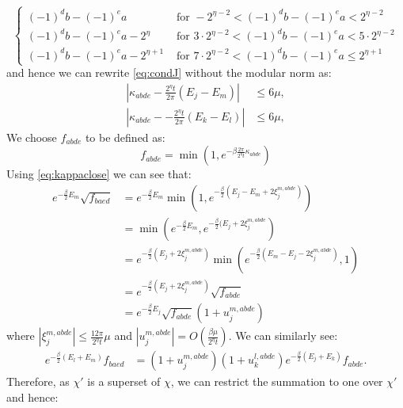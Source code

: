 \documentclass[aps,floatfix,10pt,amssymb,amsfont,amsmath,superscriptaddress,float,nofootinbib,longbibliography,nobalancelastpage,twocolumn]{revtex4-2}
\begin{document}
\begin{widetext}
\begin{equation}
\begin{cases}
     (-1)^db-(-1)^ea&\text{ for }-2^{\eta-2}<(-1)^db-(-1)^ea < 2^{\eta-2}\\
     (-1)^db-(-1)^ea-2^{\eta}&\text{ for }3\cdot 2^{\eta-2}< (-1)^db-(-1)^ea < 5\cdot2^{\eta-2}\\
     (-1)^db-(-1)^ea-2^{\eta+1}&\text{ for }7\cdot 2^{\eta-2}< (-1)^db-(-1)^ea \leq 2^{\eta+1}
    \end{cases}
\end{equation}
and hence we can rewrite \eqref{eq:condJ} without the modular norm as:
\begin{equation}
    \begin{aligned}
    \left|\kappa_{abde}-\frac{2^{\eta}t}{2\pi}(E_j-E_m)\right|&\leq 6\mu,\\
    \left|\kappa_{abde}--\frac{2^{\eta}t}{2\pi}(E_k-E_l)\right|&\leq 6\mu,
\end{aligned}
\label{eq:kappaclose}
\end{equation}
We choose $f_{abde}$ to be defined as:
\begin{equation}
    f_{abde} = \min(1,e^{-\beta\frac{2\pi}{2^{\eta}t}\kappa_{abde}})
\end{equation}
Using \eqref{eq:kappaclose} we can see that:
\begin{equation}
    \begin{aligned}
    e^{-\frac{\beta}{2}E_m}\sqrt{f_{baed}} &= e^{-\frac{\beta}{2}E_m}\min(1,e^{-\frac{\beta}{2}(E_j-E_m + 2\xi^{m,abde}_j)})\\
    &= \min(e^{-\frac{\beta}{2}E_m}, e^{-\frac{\beta}{2}(E_j + 2\xi^{m,abde}_j})\\
    &= e^{-\frac{\beta}{2}(E_j+ 2\xi^{m,abde}_j)} \min(e^{-\frac{\beta}{2}(E_m-E_j-2\xi^{m,abde}_j)},1)\\
    &= e^{-\frac{\beta}{2}(E_j+ 2\xi^{m,abde}_j)}\sqrt{f_{abde}}\\
    &= e^{-\frac{\beta}{2}E_j}\sqrt{f_{abde}}(1+u^{m,abde}_j)
\end{aligned}
\end{equation}
where $|\xi^{m,abde}_j| \leq \frac{12\pi}{2^{\eta}t}\mu$
and $|u^{m,abde}_j| = O(\frac{\beta \mu}{2^{\eta}t})$. We can similarly see:
\begin{equation}
\begin{aligned}
e^{-\frac{\beta}{2}(E_l+E_m)}f_{baed}
&=(1+u_j^{m,abde})(1+u_k^{l,abde})e^{-\frac{\beta}{2}(E_j+E_k)}f_{abde}.
\end{aligned}
\label{eq:fabtofba}
\end{equation}
Therefore, as $\chi'$ is a superset of $\chi$, we can restrict the summation to one over $\chi'$ and hence:

\end{widetext}
\end{document}
